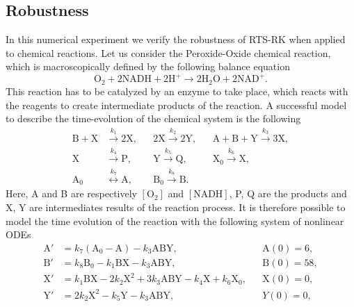 \documentclass{siamart1116}
\numberwithin{theorem}{section}
\newcommand{\rightarrowtext}[1]{\ensuremath{\stackrel{#1}{\longrightarrow}}}
\newcommand{\leftrightarrowtext}[1]{\ensuremath{\stackrel{#1}{\longleftrightarrow}}}
\begin{document}
\subsection{Robustness} In this numerical experiment we verify the robustness of RTS-RK when applied to chemical reactions. Let us consider the Peroxide-Oxide chemical reaction, which is macroscopically defined by the following balance equation
\begin{equation}
	\mathrm{O}_2 + 2\mathrm{NADH} + 2\mathrm{H}^+ \to 2\mathrm{H}_2\mathrm{O} + 2\mathrm{NAD}^+.
\end{equation}
This reaction has to be catalyzed by an enzyme to take place, which reacts with the reagents to create intermediate products of the reaction. A successful model \cite{Ols83} to describe the time-evolution of the chemical system is the following
\begin{equation}
\begin{aligned}
	\mathrm{B} + \mathrm{X} &\rightarrowtext{k_1} 2 \mathrm{X}, 
	&&2\mathrm{X} \rightarrowtext{k_2} 2\mathrm{Y}, 
	&&\mathrm{A} + \mathrm{B} + \mathrm{Y} \rightarrowtext{k_3} 3 \mathrm{X}, \\
	\mathrm{X} &\rightarrowtext{k_4} \mathrm{P}, 
	&&\mathrm{Y} \rightarrowtext{k_5} \mathrm{Q}, 
	&&\mathrm{X_0} \rightarrowtext{k_6} \mathrm{X}, \\
	\mathrm{A_0} &\leftrightarrowtext{k_7} \mathrm{A}, 
	&&\mathrm{B_0} \rightarrowtext{k_8} \mathrm{B}.
\end{aligned}
\end{equation}
Here, A and B are respectively $[\mathrm{O}_2]$ and $[\mathrm{NADH}]$, P, Q are the products and X, Y are intermediates results of the reaction process. It is therefore possible to model the time evolution of the reaction with the following system of nonlinear ODEs 
\begin{equation}\label{eq:PeroxOx}
\begin{aligned}
	\mathrm{A}' &= k_7  (\mathrm{A}_0 - \mathrm{A}) - k_3  \mathrm{A}\mathrm{B}\mathrm{Y}, &&\mathrm{A}(0) = 6, \\
	\mathrm{B}' &= k_8\mathrm{B}_0 - k_1  \mathrm{B}\mathrm{X} - k_3  \mathrm{A}\mathrm{B}\mathrm{Y}, &&\mathrm{B}(0) = 58, \\
	\mathrm{X}' &= k_1  \mathrm{B}\mathrm{X} - 2  k_2  \mathrm{X}^2 + 3  k_3 \mathrm{A}\mathrm{B}\mathrm{Y} - k_4  \mathrm{X} + k_6\mathrm{X}_0,&& \mathrm{X}(0) = 0, \\
	\mathrm{Y}' &= 2  k_2  \mathrm{X}^2 - k_5  \mathrm{Y} - k_3  \mathrm{A}\mathrm{B}\mathrm{Y}, && Y(0) = 0,
\end{aligned}
\end{equation}
\end{document}
